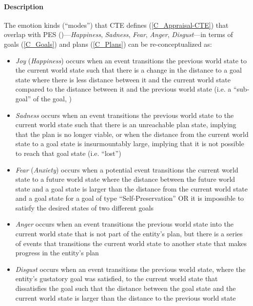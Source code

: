 \paragraph{Description} The emotion kinds (``modes'') that CTE defines
(\cref{C_Appraisal-CTE}) that overlap with PES
()---\textit{Happiness}, \textit{Sadness}, \textit{Fear},
\textit{Anger}, \textit{Disgust}---in terms of goals (\cref{C_Goals}) and plans
(\cref{C_Plans}) can be re-conceptualized as:
\begin{itemize}
    \item \textit{Joy} (\textit{Happiness}) occurs when an event transitions
    the previous world state to the current world state such that there is a
    change in the distance to a goal state where there is less distance between
    it and the current world state compared to the distance between it and the
    previous world state (i.e. a ``sub-goal'' of the goal, )

    \item \textit{Sadness} occurs when an event transitions the previous world
    state to the current world state such that there is an unreachable plan
    state, implying that the plan is no longer viable, or when the distance
    from the current world state to a goal state is insurmountably large,
    implying that it is not possible to reach that goal state (i.e. ``lost'')

    \item \textit{Fear} (\textit{Anxiety}) occurs when a potential event
    transitions the current world state to a future world state where the
    distance between the future world state and a goal state is larger than the
    distance from the current world state and a goal state for a goal of type
    ``Self-Preservation'' OR it is impossible to satisfy the desired states of
    two different goals

    \item \textit{Anger} occurs when an event transitions the previous world
    state into the current world state that is not part of the entity's plan,
    but there is a series of events that transitions the current world state to
    another state that makes progress in the entity's plan

    \item \textit{Disgust} occurs when an event transitions the previous world
    state, where the entity's gustatory goal was satisfied, to the current
    world state that dissatisfies the goal such that the distance between the
    goal state and the current world state is larger than the distance to the
    previous world state
\end{itemize}

